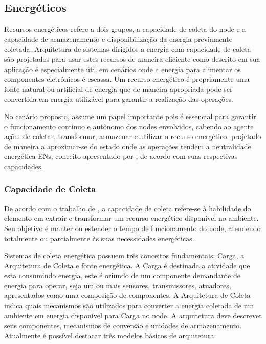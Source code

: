 
\subsection{Energéticos}

Recursos energéticos refere a dois grupos, a capacidade de coleta do node e a capacidade de armazenamento e disponibilização da energia previamente coletada. Arquitetura de sistemas dirigidos a energia com capacidade de coleta são projetados para usar estes recursos de maneira eficiente como descrito em \cite{prauzek_energy_2018} sua aplicação é especialmente útil em cenários onde a energia para alimentar os componentes eletrônicos é escassa. Um recurso energético é propriamente uma fonte natural ou artificial de energia que de maneira apropriada pode ser convertida em energia utilizável para garantir a realização das operações. 

No cenário proposto, assume um papel importante pois é essencial para garantir o funcionamento continuo e autônomo dos nodes envolvidos, cabendo ao agente ações de coletar, transformar, armazenar e utilizar o recurso energético, projetado de maneira a aproximar-se do estado onde as operações tendem a neutralidade energética \acfp{EN}, conceito apresentado por \cite{kansal_power_2007}, de acordo com suas respectivas capacidades.

\subsubsection{Capacidade de Coleta}
De acordo com o trabalho de \cite{sudevalayam_energy_2011}, a capacidade de coleta refere-se à habilidade do elemento em extrair e transformar um recurso energético disponível no ambiente. Seu objetivo é manter ou estender o tempo de funcionamento do node, atendendo totalmente ou parcialmente às suas necessidades energéticas.

Sistemas de coleta energética possuem três conceitos fundamentais: Carga, a Arquitetura de Coleta e fonte energética. A Carga é destinada a atividade que esta consumindo energia, este é oriundo de um componente demandante de  energia para operar, seja um ou mais sensores, transmissores,  atuadores, apresentados como uma composição de componentes. A Arquitetura de Coleta indica quais mecanismos são utilizados para converter a energia coletada de um ambiente em energia disponível para Carga no node. A arquitetura deve descrever seus componentes, mecanismos de conversão e unidades de armazenamento. Atualmente é possível destacar três modelos básicos de arquitetura:

